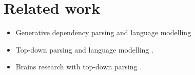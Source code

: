 \section{Related work}
\begin{itemize}
  \item Generative dependency parsing and language modelling \citep{Buys+2015:bayes-gen-dep,Buys+2015:neural-gen-dep,Buys+2018}
  \item Top-down parsing and language modelling \citep{Roark2001}.
  \item Brains research with top-down parsing \citep{Hale+2018:beam,Brennan+2016}.
\end{itemize}
